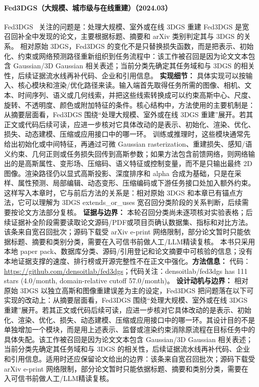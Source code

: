 \paragraph{Fed3DGS（大规模、城市级与在线重建）（2024.03）}
Fed3DGS~\cite{2403_11460} 关注的问题是：处理大规模、室外或在线 3DGS 重建 Fed3DGS 是宽召回补全中发现的论文，主要根据标题、摘要和 arXiv 类别判定其与 3DGS 的关系。
相对原始 3DGS，Fed3DGS 的变化不是只替换损失函数，而是把表示、初始化、约束或网络预测路径重新组织到任务流程中：该工作被召回是因为论文文本包含 Gaussian/3D Gaussian 相关表述；当前分类先确定其任务域和与 3DGS 的相关性，后续证据流水线再补代码、企业和引用信息。
\textbf{实现细节：} 具体实现可以按输入、核心模块和渲染/优化路径来读。输入端首先取得任务所需的图像、相机、文本、时间序列、语义或几何线索，并把这些线索转换成可以约束高斯中心、尺度、旋转、不透明度、颜色或附加特征的条件。核心结构中，方法使用的主要机制是：从摘要层面看，Fed3DGS 围绕“处理大规模、室外或在线 3DGS 重建”展开。若其正文或代码后续可读，应进一步核对它具体改动的是表示、初始化、渲染、优化、损失、动态建模、压缩或应用接口中的哪一环。 训练或推理时，这些模块通常先给出初始化或中间特征，再通过可微 Gaussian rasterization、重建损失、感知/语义约束、几何正则或任务损失回传到高斯参数；如果方法包含前馈网络，则网络输出的是高斯属性、变形场、压缩码、语义特征或控制变量，而不是只输出最终 2D 图像。渲染路径仍以显式高斯投影、深度排序和 alpha 合成为基础，只是在采样、属性预测、局部编辑、动态变形、压缩编码或下游任务接口处加入额外约束。这样写入本章时，它与前后方法的关系是：相对原始 3DGS 和本章已有锚点方法，它可以理解为 3DGS extends\_or\_uses 宽召回分类阶段的关系判断，后续需要按论文方法部分复核。
\textbf{证据与边界：} 本轮召回分类尚未逐项核对实验表格；后续证据补全阶段需要读取论文源码/PDF或项目页确认数据集、指标和对比方法。 该条来自宽召回批次；源码下载受 arXiv e-print 网络限制，部分论文暂时只能依据标题、摘要和类别分类，需要在入可信书前做人工/LLM精读复核。 本书只采用本地 paper pack、数据库分类、源码/引用登记和论文摘要中可核验的信息；没有本地证据支撑的速度、排行榜或开源完整性不在正文中强化。\textbf{方法信息：} 代码：\url{https://github.com/densoitlab/fed3dgs}；代码关注：densoitlab/fed3dgs has 111 stars (4.0/month, domain-relative cutoff 57.0/month)。
\textbf{设计动机与边界：} 相对原始 3DGS 以独立高斯和图像重建误差为主的设定，Fed3DGS 把问题落在以下可实现的改动上：从摘要层面看，Fed3DGS 围绕“处理大规模、室外或在线 3DGS 重建”展开。若其正文或代码后续可读，应进一步核对它具体改动的是表示、初始化、渲染、优化、损失、动态建模、压缩或应用接口中的哪一环。其设计目的不是单独增加一个模块，而是用上述表示、监督或渲染约束消除原流程在目标任务中的具体失配。该工作被召回是因为论文文本包含 Gaussian/3D Gaussian 相关表述；当前分类先确定其任务域和与 3DGS 的相关性，后续证据流水线再补代码、企业和引用信息。适用时还应保留论文给出的边界：该条来自宽召回批次；源码下载受 arXiv e-print 网络限制，部分论文暂时只能依据标题、摘要和类别分类，需要在入可信书前做人工/LLM精读复核。
